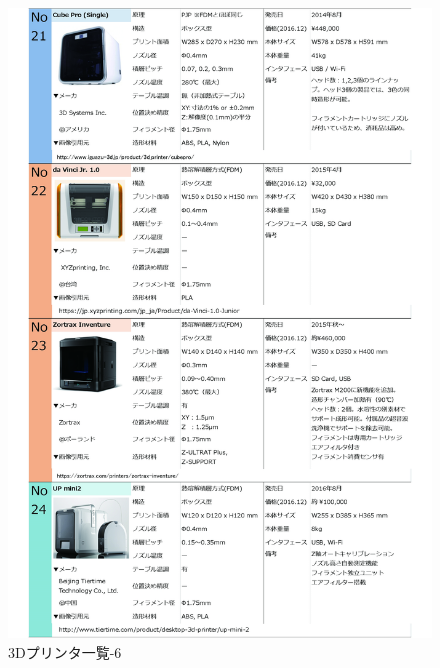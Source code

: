 \begin{figure}[htbp]
\centering
\includegraphics[width=380pt]{fig/fig29_cmyk.jpg}
\caption{3Dプリンタ一覧-6}
\label{fig29}
\end{figure}

